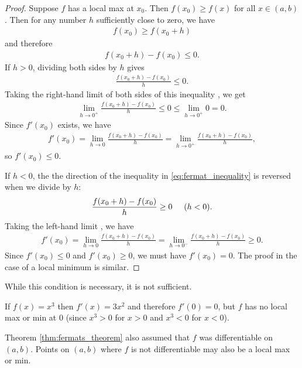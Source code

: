 \documentclass[12pt,letterpaper,reqno]{article}
\numberwithin{equation}{section}
\newcommand{\fixme}[1]{{\color{orange}{[#1]}}}
\begin{document}
{\begin{proof}
	Suppose $f$ has a local max at $x_0$. Then $f(x_0)\geq f(x)$ for all $x \in (a,b)$. Then for any number $h$ sufficiently close to zero, we have
	\begin{align*}
		f(x_0) \geq f(x_0+h)
	\end{align*}
	and therefore
	\begin{align}\label{eq:fermat_inequality}
		f(x_0+h)-f(x_0) \leq 0.
	\end{align}
	If $h>0$, dividing both sides by $h$ gives
	\begin{align*}
		\frac{f(x_0+h)-f(x_0)}{h}\leq 0.
	\end{align*}
	Taking the right-hand limit of both sides of this inequality \fixme{Justify this.}, we get
	\begin{align*}
		\lim_{h \to 0^+}\frac{f(x_0+h)-f(x_0)}{h}\leq 0 \leq \lim_{h \to 0^+}0=0.
	\end{align*}
	Since $f'(x_0)$ exists, we have
	\begin{align*}
		f'(x_0)=\lim_{h \to 0}\frac{f(x_0+h)-f(x_0)}{h}=\lim_{h \to 0^+}\frac{f(x_0+h)-f(x_0)}{h},
	\end{align*}
	so $f'(x_0) \leq 0$.
	
	If $h<0$, the the direction of the inequality in \eqref{eq:fermat_inequality} is reversed when we divide by $h$:
	\begin{align*}
		\frac{f(x_0+h)-f(x_0)}{h} \geq 0 \hspace{0.5cm} (h<0).
	\end{align*}
	Taking the left-hand limit \fixme{Justify this.}, we have
	\begin{align*}
		f'(x_0)=\lim_{h \to 0}\frac{f(x_0+h)-f(x_0)}{h}=\lim_{h \to 0^-}\frac{f(x_0+h)-f(x_0)}{h}\geq 0.
	\end{align*}
	Since $f'(x_0) \leq 0$ and $f'(x_0)\geq 0$, we must have $f'(x_0)=0$. The proof in the case of a local minimum is similar.
\end{proof}

While this condition is necessary, it is not sufficient.
\begin{example}
If $f(x)=x^3$ then $f'(x)=3x^2$ and therefore $f'(0)=0$, but $f$ has no local max or min at $0$ (since $x^3>0$ for $x>0$ and $x^3<0$ for $x<0$).	
\end{example}

Theorem \ref{thm:fermats_theorem} also assumed that $f$ was differentiable on $(a,b)$. Points on $(a,b)$ where $f$ is not differentiable may also be a local max or min.

}
\end{document}
